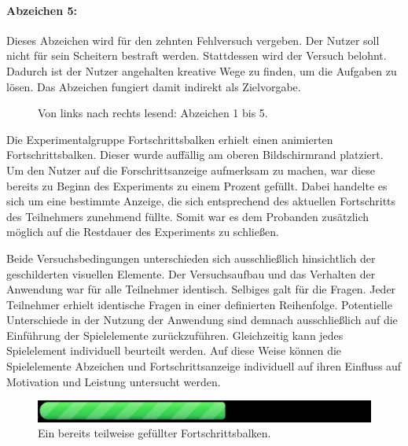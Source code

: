 \paragraph{Abzeichen 5:}
Dieses Abzeichen wird für den zehnten Fehlversuch vergeben. Der Nutzer soll nicht für sein Scheitern bestraft werden. Stattdessen wird der Versuch belohnt. Dadurch ist der Nutzer angehalten kreative Wege zu finden, um die Aufgaben zu lösen. Das Abzeichen fungiert damit indirekt als Zielvorgabe.


\begin{figure}[htbp]
    \centering
    
    
    
    
    
    \caption{Von links nach rechts lesend: Abzeichen 1 bis 5.}
\end{figure}


Die Experimentalgruppe Fortschrittsbalken erhielt einen animierten Fortschrittsbalken. Dieser wurde auffällig am oberen Bildschirmrand platziert. Um den Nutzer auf die Forschrittsanzeige aufmerksam zu machen, war diese bereits zu Beginn des Experiments zu einem Prozent gefüllt. Dabei handelte es sich um eine bestimmte Anzeige, die sich entsprechend des aktuellen Fortschritts des Teilnehmers zunehmend füllte. Somit war es dem Probanden zusätzlich möglich auf die Restdauer des Experiments zu schließen.

Beide Versuchsbedingungen unterschieden sich ausschließlich hinsichtlich der geschilderten visuellen Elemente. Der Versuchsaufbau und das Verhalten der Anwendung war für alle Teilnehmer identisch. Selbiges galt für die Fragen. Jeder Teilnehmer erhielt identische Fragen in einer definierten Reihenfolge. Potentielle Unterschiede in der Nutzung der Anwendung sind demnach ausschließlich auf die Einführung der Spielelemente zurückzuführen. Gleichzeitig kann jedes Spielelement individuell beurteilt werden.  Auf diese Weise können die Spielelemente Abzeichen und Fortschrittsanzeige individuell auf ihren Einfluss auf Motivation und Leistung untersucht werden.

\begin{figure}[htbp]
    \centering
    \includegraphics[width=\textwidth]{img/progressbar.png}
    \caption{Ein bereits teilweise gefüllter Fortschrittsbalken.}
\end{figure}

